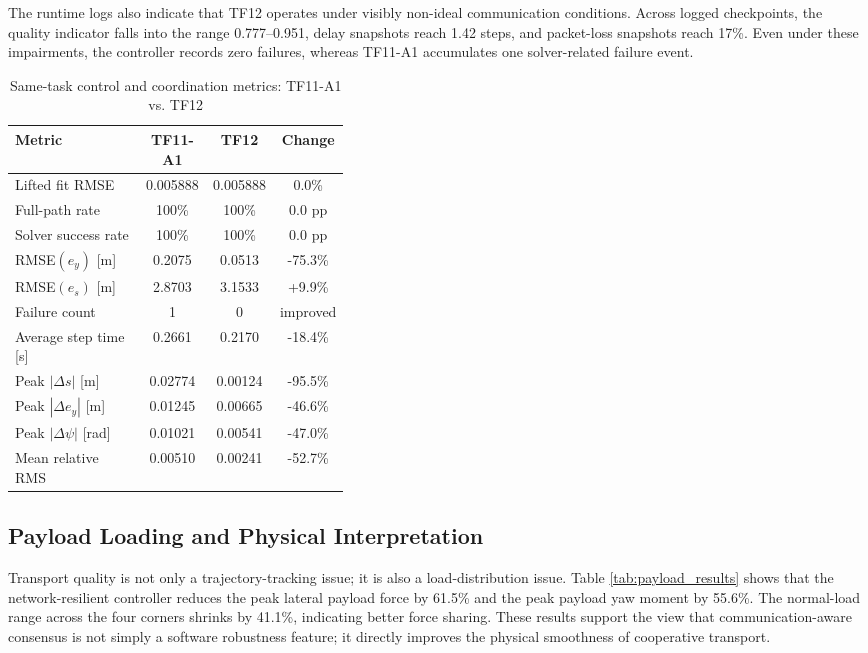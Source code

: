 \documentclass[twocolumn,3p,times,procedia]{elsarticle}
\newcommand{\tfone}{TF11-A1}
\newcommand{\tftwo}{TF12}
\begin{document}
The runtime logs also indicate that \tftwo{} operates under visibly non-ideal communication conditions. Across logged checkpoints, the quality indicator falls into the range 0.777--0.951, delay snapshots reach 1.42 steps, and packet-loss snapshots reach 17\%. Even under these impairments, the controller records zero failures, whereas \tfone{} accumulates one solver-related failure event.

\begin{table}[h]
\footnotesize
\centering
\begin{threeparttable}
\setlength{\abovecaptionskip}{0pt}
\caption{Same-task control and coordination metrics: \tfone{} vs. \tftwo{}}
\label{tab:control_results}
\begin{tabular}{p{0.39\linewidth} c c c}
\toprule
Metric & \tfone{} & \tftwo{} & Change \\
\midrule
Lifted fit RMSE & 0.005888 & 0.005888 & 0.0\% \\
Full-path rate & 100\% & 100\% & 0.0 pp \\
Solver success rate & 100\% & 100\% & 0.0 pp \\
RMSE$(e_y)$ [m] & 0.2075 & 0.0513 & -75.3\% \\
RMSE$(e_s)$ [m] & 2.8703 & 3.1533 & +9.9\% \\
Failure count & 1 & 0 & improved \\
Average step time [s] & 0.2661 & 0.2170 & -18.4\% \\
Peak $|\Delta s|$ [m] & 0.02774 & 0.00124 & -95.5\% \\
Peak $|\Delta e_y|$ [m] & 0.01245 & 0.00665 & -46.6\% \\
Peak $|\Delta \psi|$ [rad] & 0.01021 & 0.00541 & -47.0\% \\
Mean relative RMS & 0.00510 & 0.00241 & -52.7\% \\
\bottomrule
\end{tabular}
\end{threeparttable}
\end{table}

\subsection{Payload Loading and Physical Interpretation}
Transport quality is not only a trajectory-tracking issue; it is also a load-distribution issue. Table \ref{tab:payload_results} shows that the network-resilient controller reduces the peak lateral payload force by 61.5\% and the peak payload yaw moment by 55.6\%. The normal-load range across the four corners shrinks by 41.1\%, indicating better force sharing. These results support the view that communication-aware consensus is not simply a software robustness feature; it directly improves the physical smoothness of cooperative transport.
\end{document}
